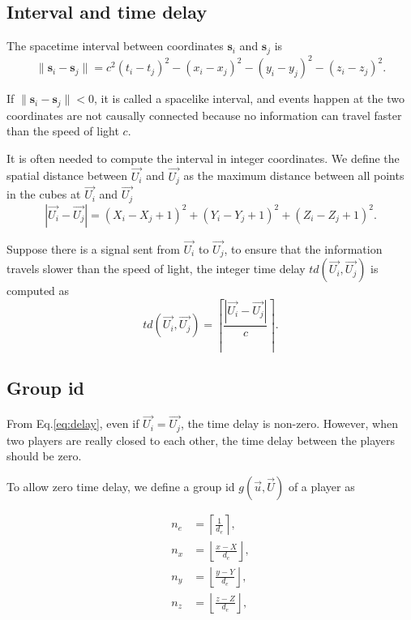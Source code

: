\documentclass{article}
\begin{document}
\subsection{Interval and time delay}

The spacetime interval between coordinates $\textbf{s}_i$ and $\textbf{s}_j$ is
\begin{equation}
    \|\textbf{s}_i - \textbf{s}_j\| = c^2 (t_i - t_j)^2 - (x_i - x_j)^2 - (y_i - y_j)^2 - (z_i - z_j)^2.
\end{equation}

If $\|\textbf{s}_i - \textbf{s}_j\| < 0$, it is called a spacelike interval, and events happen at the two coordinates
are not causally connected because no information can travel faster than the speed of light $c$.

It is often needed to compute the interval in integer coordinates.
We define the spatial distance between $\overrightarrow{U_i}$
and $\overrightarrow{U_j}$ as the maximum distance between all points in the cubes at 
$\overrightarrow{U_i}$ and $\overrightarrow{U_j}$
\begin{equation} \label{eq:delay}
    |\overrightarrow{U_i} - \overrightarrow{U_j}| = (X_i - X_j + 1)^2 + (Y_i - Y_j + 1)^2 + (Z_i - Z_j + 1)^2.
\end{equation}

Suppose there is a signal sent from $\overrightarrow{U_i}$ to $\overrightarrow{U_j}$, 
to ensure that the information travels slower than the speed of light, 
the integer time delay $td(\overrightarrow{U_i}, \overrightarrow{U_j})$ is computed as
\begin{equation} 
    td(\overrightarrow{U_i}, \overrightarrow{U_j}) = \left \lceil \frac{|\overrightarrow{U_i} - \overrightarrow{U_j}|}{c} \right \rceil.
\end{equation}

\subsection{Group id}

From Eq.\ref{eq:delay}, even if $\overrightarrow{U_i} = \overrightarrow{U_j}$, the time delay is non-zero.
However, when two players are really closed to each other, the time delay between the players should be zero.

To allow zero time delay, we define a group id $g(\overrightarrow{u}, \overrightarrow{U})$ of a player as

\begin{align*}
    n_e &= \left \lceil \frac{1}{d_e} \right \rceil, \\
    n_x &= \left \lfloor \frac{x - X} {d_e} \right \rfloor, \\
    n_y &= \left \lfloor \frac{y - Y} {d_e} \right \rfloor, \\
    n_z &= \left \lfloor \frac{z - Z} {d_e} \right \rfloor,
\end{align*}
\end{document}

